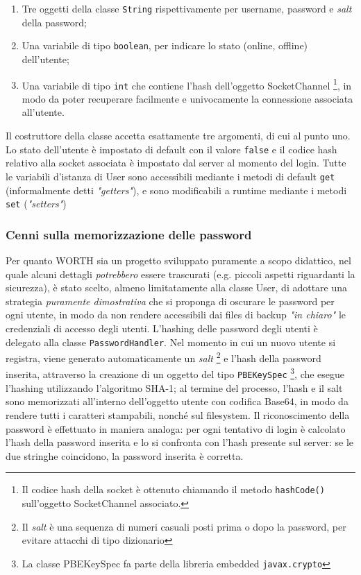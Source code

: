 \documentclass{article}
\begin{document}
\begin{enumerate}
    \item Tre oggetti della classe \texttt{String} rispettivamente per username, password e \emph{salt} della password;
    \item Una variabile di tipo \texttt{boolean}, per indicare lo stato (online, offline) dell'utente;
    \item Una variabile di tipo \texttt{int} che contiene l'hash
          dell'oggetto SocketChannel
          \footnote{Il codice hash della socket è ottenuto chiamando il metodo \texttt{hashCode()} sull'oggetto SocketChannel associato.},
          in modo da poter recuperare facilmente e univocamente la connessione associata all'utente.
\end{enumerate}
Il costruttore della classe accetta esattamente tre argomenti, di cui al punto uno. Lo stato dell'utente è impostato di default con il valore \texttt{false} e il codice hash relativo alla socket associata è impostato dal server al momento del login. Tutte le variabili d'istanza di User sono accessibili mediante i metodi di default \texttt{get} (informalmente detti \emph{"getters"}), e sono modificabili a runtime mediante i metodi \texttt{set} (\emph{"setters"})

\subsubsection{Cenni sulla memorizzazione delle password}
Per quanto WORTH sia un progetto sviluppato puramente a scopo didattico, nel quale alcuni dettagli \emph{potrebbero} essere trascurati (e.g. piccoli aspetti riguardanti la sicurezza), è stato scelto, almeno limitatamente alla classe User, di adottare una strategia \emph{puramente dimostrativa} che si proponga di oscurare le password per ogni utente, in modo da non rendere accessibili dai files di backup \emph{"in chiaro"} le credenziali di accesso degli utenti.
L'hashing delle password degli utenti è delegato alla classe \texttt{PasswordHandler}. Nel momento in cui un nuovo utente si registra, viene generato automaticamente un \emph{salt}
\footnote{Il \emph{salt} è una sequenza di numeri casuali posti prima o dopo la password, per evitare attacchi di tipo dizionario} 
e l'hash della password inserita, attraverso la creazione di un oggetto del tipo \texttt{PBEKeySpec}
\footnote{La classe PBEKeySpec fa parte della libreria embedded \texttt{javax.crypto}}, 
che esegue l'hashing utilizzando l'algoritmo SHA-1; al termine del processo, l'hash e il salt sono memorizzati all'interno dell'oggetto utente con codifica Base64, in modo da rendere tutti i caratteri stampabili, nonché sul filesystem.
Il riconoscimento della password è effettuato in maniera analoga: per ogni tentativo di login è calcolato l'hash della password inserita e lo si confronta con l'hash presente sul server: se le due stringhe coincidono, la password inserita è corretta.
\end{document}
